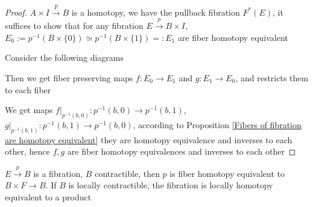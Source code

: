 \documentclass[main]{subfiles}
\begin{document}
\begin{proof}
$A\times I\xrightarrow{F} B$ is a homotopy, we have the pullback fibration $F^*(E)$, it suffices to show that for any fibration $E\xrightarrow{p}B\times I$, $E_0:=p^{-1}(B\times\{0\})\simeq p^{-1}(B\times\{1\})=:E_1$ are fiber homotopy equivalent \par
Consider the following diagrams
\begin{center}
\end{center}
\begin{center}
\end{center}
Then we get fiber preserving maps $f:E_0\to E_1$ and $g:E_1\to E_{0}$, and restricts them to each fiber
\begin{center}
\end{center}
\begin{center}
\end{center}
We get maps $f|_{p^{-1}(b,0)}:p^{-1}(b,0)\to p^{-1}(b,1)$, $g|_{p^{-1}(b,1)}:p^{-1}(b,1)\to p^{-1}(b,0)$, according to Proposition \ref{Fibers of fibration are homotopy equivalent} they are homotopy equivalence and inverses to each other, hence $f,g$ are fiber homotopy equivalences and inverses to each other
\end{proof}

\begin{corollary}
$E\xrightarrow{p}B$ is a fibration, $B$ contractible, then $p$ is fiber homotopy equivalent to $B\times F\to B$. If $B$ is locally contractible, the fibration is locally homotopy equivalent to a product
\end{corollary}
\end{document}
